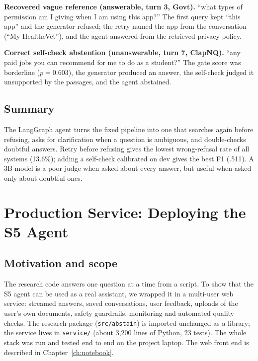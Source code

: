 \documentclass[11pt,a4paper]{report}
\begin{document}
\textbf{Recovered vague reference (answerable, turn 3, Govt).} ``what types of permission am I giving when I am using this app?'' The first query kept ``this app'' and the generator refused; the retry named the app from the conversation (``My HealtheVet''), and the agent answered from the retrieved privacy policy.

\textbf{Correct self-check abstention (unanswerable, turn 7, ClapNQ).} ``any paid jobs you can recommend for me to do as a student?'' The gate score was borderline ($p=0.603$), the generator produced an answer, the self-check judged it unsupported by the passages, and the agent abstained.

\section{Summary}
The LangGraph agent turns the fixed pipeline into one that searches again before refusing, asks for clarification when a question is ambiguous, and double-checks doubtful answers. Retry before refusing gives the lowest wrong-refusal rate of all systems (13.6\%); adding a self-check calibrated on dev gives the best F1 (.511). A 3B model is a poor judge when asked about every answer, but useful when asked only about doubtful ones.

\chapter{Production Service: Deploying the S5 Agent}\label{ch:service}

\section{Motivation and scope}
The research code answers one question at a time from a script. To show that the S5 agent can be used as a real assistant, we wrapped it in a multi-user web service: streamed answers, saved conversations, user feedback, uploads of the user's own documents, safety guardrails, monitoring and automated quality checks. The research package (\texttt{src/abstain}) is imported unchanged as a library; the service lives in \texttt{service/} (about 3{,}200 lines of Python, 23 tests). The whole stack was run and tested end to end on the project laptop. The web front end is described in Chapter~\ref{ch:notebook}.
\end{document}
